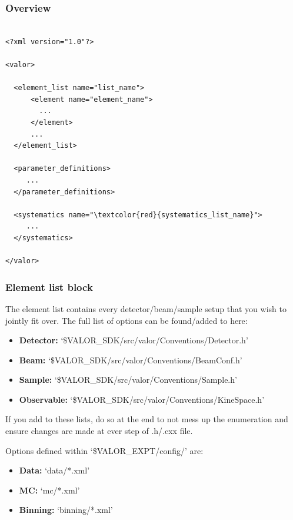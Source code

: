 \subsubsection{Overview}
\label{sec:config/analysis/overview}

{\color{capri}
\begin{verbatim}

<?xml version="1.0"?>

<valor> 

  <element_list name="list_name">
      <element name="element_name">
        ...
      </element>
      ...
  </element_list>

  <parameter_definitions>
     ...
  </parameter_definitions>

  <systematics name="\textcolor{red}{systematics_list_name}">
     ...
  </systematics>

</valor> 

\end{verbatim}
}



\subsubsection{Element list block}

The element list contains every detector/beam/sample setup that you wish to jointly fit over. The full list of options can be found/added to here:
\begin{itemize}
    \item \textbf{Detector:} `\$VALOR\_SDK/src/valor/Conventions/Detector.h'
    \item \textbf{Beam:} `\$VALOR\_SDK/src/valor/Conventions/BeamConf.h'
    \item \textbf{Sample:} `\$VALOR\_SDK/src/valor/Conventions/Sample.h'
    \item \textbf{Observable:} `\$VALOR\_SDK/src/valor/Conventions/KineSpace.h'
\end{itemize}
If you add to these lists, do so at the end to not mess up the enumeration and ensure changes are made at ever step of .h/.cxx file. 

Options defined within `\$VALOR\_EXPT/config/' are:
\begin{itemize}
    \item \textbf{Data:} `data/*.xml'
    \item \textbf{MC:} `mc/*.xml'
    \item \textbf{Binning:} `binning/*.xml'
\end{itemize}

